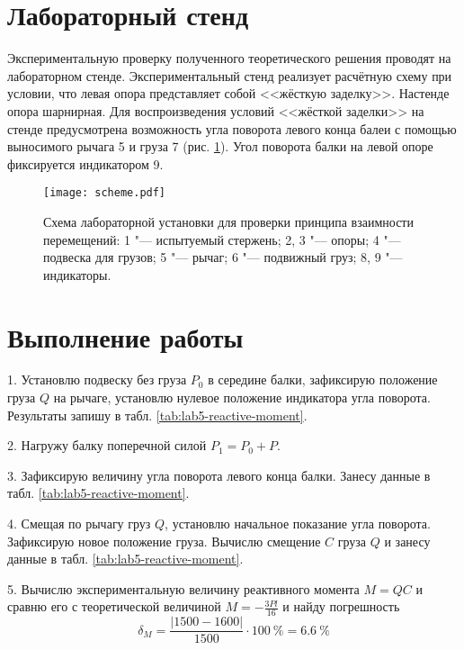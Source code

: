 \section{Лабораторный стенд}
Экспериментальную проверку полученного теоретического решения проводят на лабораторном стенде.
Экспериментальный стенд реализует расчётную схему при условии, что левая опора представляет собой <<жёсткую заделку>>.
Настенде опора шарнирная.
Для воспроизведения условий <<жёсткой заделки>> на стенде предусмотрена возможность угла поворота левого конца балеи с помощью выносимого рычага 5 и груза 7 (рис. \ref{fig:scheme}).
Угол поворота балки на левой опоре фиксируется индикатором 9.

\begin{figure}[!ht]
    \centering
    \texttt{[image: scheme.pdf]}
    \caption{Схема лабораторной установки для проверки принципа взаимности перемещений:
        1 "--- испытуемый стержень;
        2, 3 "--- опоры;
        4 "--- подвеска для грузов;
        5 "--- рычаг;
        6 "--- подвижный груз;
        8, 9 "--- индикаторы.}
        \label{fig:scheme}
    \end{figure}

\section{Выполнение работы}

1. Установлю подвеску без груза $P_0$ в середине балки, зафиксирую положение груза $Q$ на рычаге, установлю нулевое положение индикатора угла поворота.
Результаты запишу в табл. \ref{tab:lab5-reactive-moment}.

2. Нагружу балку поперечной силой $P_1 = P_0 + P$.

3. Зафиксирую величину угла поворота левого конца балки.
Занесу данные в табл. \ref{tab:lab5-reactive-moment}.

4. Смещая по рычагу груз $Q$, установлю начальное показание угла поворота.
Зафиксирую новое положение груза.
Вычислю смещение $C$ груза $Q$ и занесу данные в табл. \ref{tab:lab5-reactive-moment}.

5. Вычислю экспериментальную величину реактивного момента $M = QC$ и сравню его с теоретической величиной $M = -\frac{3 P l}{16}$ и найду погрешность
\[
    \delta_M = \frac{|1500 - 1600|}{1500} \cdot 100~\% = 6.6~\%
\]

